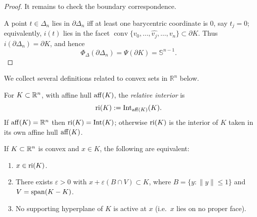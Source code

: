 \begin{proof}
It remains to check the boundary correspondence. 

A point $t\in\Delta_n$ lies in $\partial \Delta_n$ iff at least one barycentric coordinate is $0$, say $t_j=0$; equivalently, $i(t)$ lies in the facet $\operatorname{conv}\{v_0,\dots,\widehat{v_j},\dots,v_n\}\subset\partial K$. Thus $i(\partial \Delta_n)=\partial K$, and hence
\[
   \Phi_\Delta(\partial \Delta_n)=\Psi(\partial K)=\mathbb{S}^{n-1}.
\]
\end{proof}

\begin{remark}\label{rmk:convex-collect}
We collect several definitions related to convex sets in $\mathbb{R}^n$ below.
\end{remark}

\begin{definition}\label{def:ri}
For $K\subset\mathbb{R}^n$, with affine hull $\operatorname{aff}(K)$, the \emph{relative interior} is
\[
\operatorname{ri}(K):=\operatorname{Int}_{\operatorname{aff}(K)}(K).
\]
If $\operatorname{aff}(K)=\mathbb{R}^n$ then $\operatorname{ri}(K)=\operatorname{Int}(K)$; otherwise $\operatorname{ri}(K)$ is the interior of $K$ taken in its own affine hull $\operatorname{aff}(K)$.
\end{definition}

\begin{proposition}\label{prop:ri-equiv}
If $K\subset\mathbb{R}^n$ is convex and $x\in K$, the following are equivalent:
\begin{enumerate}
\item $x\in\operatorname{ri}(K)$.
\item There exists $\varepsilon>0$ with $x+\varepsilon(B\cap V)\subset K$, where
$B=\{y:\|y\|\le 1\}$ and $V=\operatorname{span}(K-K)$.
\item No supporting hyperplane of $K$ is active at $x$ (i.e.\ $x$ lies on no proper face).
\end{enumerate}
\end{proposition}

